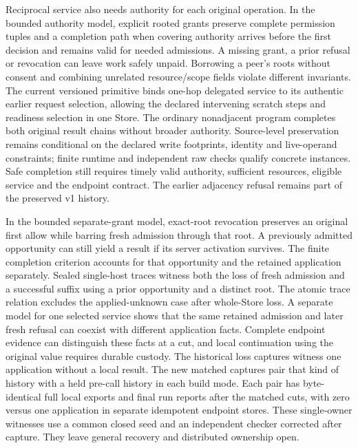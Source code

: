 \documentclass[11pt,a4paper]{article}
\theoremstyle{definition}
\theoremstyle{remark}
\begin{document}
Reciprocal service also needs authority for each original operation. In the bounded authority model, explicit rooted grants preserve complete permission tuples and a completion path when covering authority arrives before the first decision and remains valid for needed admissions. A missing grant, a prior refusal or revocation can leave work safely unpaid. Borrowing a peer's roots without consent and combining unrelated resource/scope fields violate different invariants. The current versioned primitive binds one-hop delegated service to its authentic earlier request selection, allowing the declared intervening scratch steps and readiness selection in one Store. The ordinary nonadjacent program completes both original result chains without broader authority. Source-level preservation remains conditional on the declared write footprints, identity and live-operand constraints; finite runtime and independent raw checks qualify concrete instances. Safe completion still requires timely valid authority, sufficient resources, eligible service and the endpoint contract. The earlier adjacency refusal remains part of the preserved v1 history.

In the bounded separate-grant model, exact-root revocation preserves an original first allow while barring fresh admission through that root. A previously admitted opportunity can still yield a result if its server activation survives. The finite completion criterion accounts for that opportunity and the retained application separately. Sealed single-host traces witness both the loss of fresh admission and a successful suffix using a prior opportunity and a distinct root. The atomic trace relation excludes the applied-unknown case after whole-Store loss. A separate model for one selected service shows that the same retained admission and later fresh refusal can coexist with different application facts. Complete endpoint evidence can distinguish these facts at a cut, and local continuation using the original value requires durable custody. The historical loss captures witness one application without a local result. The new matched captures pair that kind of history with a held pre-call history in each build mode. Each pair has byte-identical full local exports and final run reports after the matched cuts, with zero versus one application in separate idempotent endpoint stores. These single-owner witnesses use a common closed seed and an independent checker corrected after capture. They leave general recovery and distributed ownership open.
\end{document}
